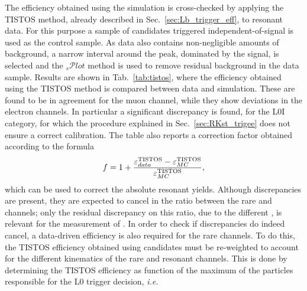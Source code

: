 The efficiency obtained using the simulation is cross-checked by applying the \mbox{TISTOS}
 method, already described in Sec.~\ref{sec:Lb_trigger_eff}, to resonant data.
%
%
For this purpose a sample of \BdToKstJPsll candidates triggered independent-of-signal is used
as the control sample. As data also contains non-negligible amounts of background, 
a narrow interval around the peak, dominated by the signal, is selected and the $_{s}\mathcal{P}lot$ method
is used to remove residual background in the data sample. 
Results are shown in Tab.~\ref{tab:tistos}, where the
efficiency obtained using the TISTOS method is compared between data and simulation.
These are found to be in agreement for the muon channel,
while they show deviations in the electron channels. In particular a significant discrepancy is found,
for the L0I category, for which the procedure explained in Sec.~\ref{sec:RKst_trigee} does not ensure
a correct calibration. The table also reports a correction factor
obtained according to the formula
\begin{equation}
f = 1 + \frac{\varepsilon_{data}^{\rm TISTOS} - \varepsilon_{MC}^{\rm  TISTOS}}{\varepsilon_{MC}^{\rm  TISTOS}},
\end{equation}
which can be used to correct the absolute resonant yields.
%
Although discrepancies are present, they are expected to cancel in the ratio between the rare and \jpsi channels;
only the residual discrepancy on this ratio, due to the different \qsq, is relevant for the measurement of \RKst.
In order to check if discrepancies do indeed cancel, a data-driven efficiency is
also required for the rare channels. To do this, the TISTOS efficiency obtained using \BdToKstJPsll candidates 
must be re-weighted to account for the different kinematics of the rare and resonant channels. This is done by determining
the TISTOS efficiency as function of the maximum \pt of the particles responsible for the L0 trigger decision, \emph{i.e.} 
